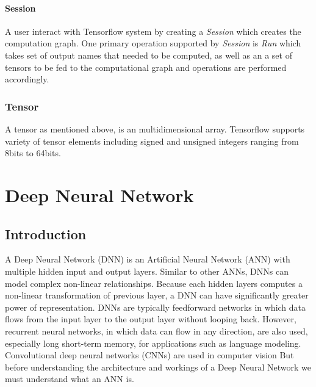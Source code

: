 \documentclass[12pt, a4paper]{report}
\begin{document}
 \subsubsection{Session}\label{session}
A user interact with Tensorflow system by creating a \textit{Session} which creates the computation graph. One primary operation supported by \textit{Session} is \textit{Run} which takes set of output names that needed to be computed, as well as an a set of tensors to be fed to the computational graph and operations are performed accordingly.

\subsection{Tensor}\label{tensor}

A tensor as mentioned above, is an multidimensional array. Tensorflow supports variety of tensor elements including signed and unsigned integers ranging from 8bits to 64bits.

\clearpage

\chapter{Deep Neural Network}\label{ref:DNN} 

\section{Introduction}\label{sec:intro_dnn}

A Deep Neural Network (DNN) is an Artificial Neural Network (ANN) with multiple hidden input and output layers. Similar to other ANNs, DNNs can model complex non-linear relationships. Because each hidden layers computes a non-linear transformation of previous layer, a DNN can have significantly greater power of representation. DNNs are typically feedforward networks in which data flows from the input layer to the output layer without looping back. However, recurrent neural networks, in which data can flow in any direction, are also used, especially long short-term memory, for applications such as language modeling. Convolutional deep neural networks (CNNs) are used in computer vision But before understanding the architecture and workings of a Deep Neural Network we must understand what an ANN is. \\ \par
\end{document}
